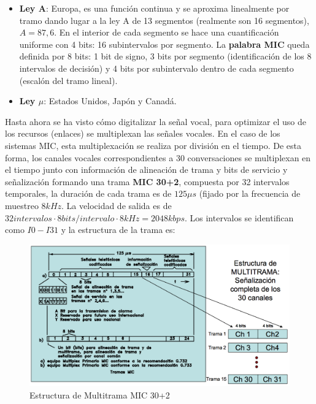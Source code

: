 \documentclass[10pt,portrait, twocolumn]{article}
\makeatletter
\renewcommand{\subsubsection}{\@startsection{subsubsection}{3}{0mm}%
                                {-1ex plus -.5ex minus -.2ex}%
                                {1ex plus .2ex}%
                                {\normalfont\small\bfseries}}
\makeatother
\begin{document}
	\begin{itemize}
		\item \textbf{Ley A}: Europa, es una función continua y se aproxima linealmente por tramo dando lugar a la ley A de 13 segmentos (realmente son 16 segmentos), $A = 87,6$. En el interior de cada segmento se hace una cuantificación uniforme con 4 bits: 16 subintervalos por segmento. La \textbf{palabra MIC} queda definida por 8 bits: 1 bit de signo, 3 bits por segmento (identificación de los 8 intervalos de decisión) y 4 bits por subintervalo dentro de cada segmento (escalón del tramo lineal).
		\item \textbf{Ley $\mu$}: Estados Unidos, Japón y Canadá.
	\end{itemize}



Hasta ahora se ha visto cómo digitalizar la señal vocal, para optimizar el uso de los recursos (enlaces) se multiplexan las señales vocales. En el caso de los sistemas MIC, esta multiplexación se realiza por división en el tiempo. De esta forma, los canales vocales correspondientes a 30 conversaciones se multiplexan en el tiempo junto con información de alineación de trama y bits de servicio y señalización formando una trama \textbf{MIC 30+2}, compuesta por 32 intervalos temporales, la duración de cada trama es de $125 \mu s$ (fijado por la frecuencia de muestreo $8kHz$. La velocidad de salida es de $32 intervalos \cdot 8 bits / intervalo \cdot 8 kHz = 2048 kbps$. Los intervalos se identifican como $I0 - I31$ y la estructura de la trama es:
	

	\begin{figure}[!ht]
 		\centering
  		 \includegraphics[scale = 0.4]{images/TramaMIC}
		\caption{Estructura de Multitrama MIC 30+2}
	\end{figure}
\end{document}
